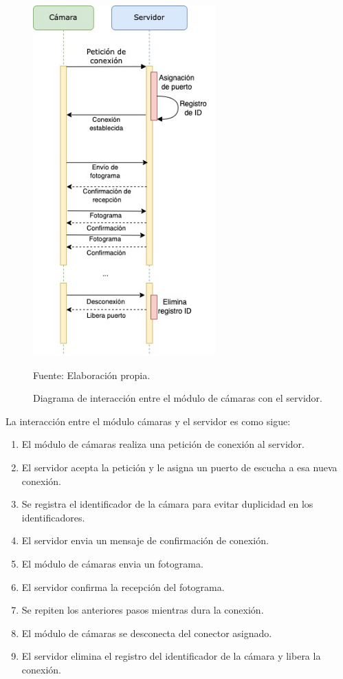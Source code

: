 \begin{figure}[H]
    \begin{center}
        \includegraphics[width=7cm]{img/capitulo_4/sec_cam_serv.jpg}
    \end{center}
    \begin{center}
        \caption{Diagrama de interacción entre el módulo de cámaras con el servidor.}
        Fuente: Elaboración propia.
        \label{fig:diag_sec_mod_camera}
    \end{center}
\end{figure}

La interacción entre el módulo cámaras y el servidor es como sigue:
\begin{enumerate}
    \item El módulo de cámaras realiza una petición de conexión al servidor.
    \item El servidor acepta la petición y le asigna un puerto de escucha a esa nueva conexión.
    \item Se registra el identificador de la cámara para evitar duplicidad en los identificadores.
    \item El servidor envia un mensaje de confirmación de conexión.
    \item El módulo de cámaras envia un fotograma.
    \item El servidor confirma la recepción del fotograma.
    \item Se repiten los anteriores pasos mientras dura la conexión.
    \item El módulo de cámaras se desconecta del conector asignado.
    \item El servidor elimina el registro del identificador de la cámara y libera la conexión. 
\end{enumerate}


